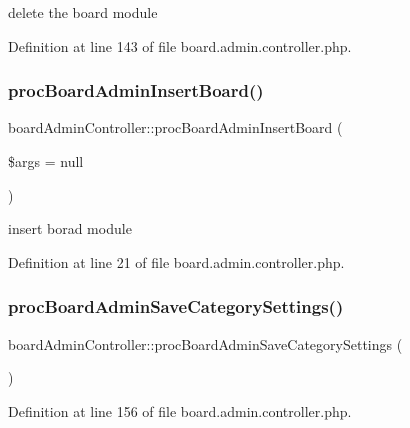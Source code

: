 delete the board module 



Definition at line 143 of file board.\+admin.\+controller.\+php.

\mbox{\label{classboardAdminController_a4d236333faef58446094c8d5d66228b1}} 
\subsubsection{\texorpdfstring{proc\+Board\+Admin\+Insert\+Board()}{procBoardAdminInsertBoard()}}
{\footnotesize\ttfamily board\+Admin\+Controller\+::proc\+Board\+Admin\+Insert\+Board (\begin{DoxyParamCaption}\item[{}]{\$args = {\ttfamily null} }\end{DoxyParamCaption})}



insert borad module 



Definition at line 21 of file board.\+admin.\+controller.\+php.

\mbox{\label{classboardAdminController_a0a35a01898405781ecaecca2bc34e709}} 
\subsubsection{\texorpdfstring{proc\+Board\+Admin\+Save\+Category\+Settings()}{procBoardAdminSaveCategorySettings()}}
{\footnotesize\ttfamily board\+Admin\+Controller\+::proc\+Board\+Admin\+Save\+Category\+Settings (\begin{DoxyParamCaption}{ }\end{DoxyParamCaption})}



Definition at line 156 of file board.\+admin.\+controller.\+php.

